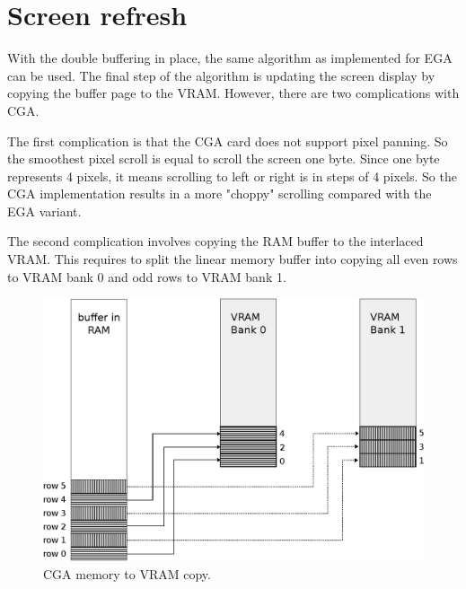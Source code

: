 \documentclass[book.tex]{subfiles}
\begin{document}
\section{Screen refresh}
With the double buffering in place, the same algorithm as implemented for EGA can be used. The final step of the algorithm is updating the screen display by copying the buffer page to the VRAM. However, there are two complications with CGA.\\

\par
The first complication is that the CGA card does not support pixel panning. So the smoothest pixel scroll is equal to scroll the screen one byte. Since one byte represents 4 pixels, it means scrolling to left or right is in steps of 4 pixels. So the CGA implementation results in a more "choppy" scrolling compared with the EGA variant.\\

\par
\begin{minipage}{\textwidth}
  
\end{minipage}
\label{state_type}
\par

The second complication involves copying the RAM buffer to the interlaced VRAM. This requires to split the linear memory buffer into copying all even rows to VRAM bank 0 and odd rows to VRAM bank 1.\\

\begin{figure}[H]
\centering
\includegraphics[width=1.0\textwidth]{imgs/drawings/cga_VRAM_copy.eps}
\caption{CGA memory to VRAM copy.}
\label{fig:cga_interlaced}
\end{figure}
\end{document}

